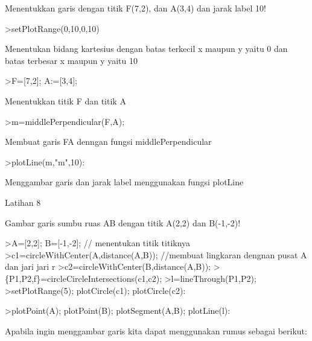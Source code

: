 \documentclass[a4paper,10pt]{article}
\begin{document}
\begin{eulernotebook}
\begin{eulercomment}
\begin{eulercomment}
\eulersubheading{}
\begin{eulercomment}
Menentukkan garis dengan titik F(7,2), dan A(3,4) dan jarak label 10!
\end{eulercomment}
\begin{eulerprompt}
>setPlotRange(0,10,0,10)
\end{eulerprompt}
\begin{euleroutput}
  [0,  10,  0,  10]
\end{euleroutput}
\begin{eulercomment}
Menentukan bidang kartesius dengan batas terkecil x maupun y yaitu 0
dan batas terbesar x maupun y yaitu 10
\end{eulercomment}
\begin{eulerprompt}
>F=[7,2]; A:=[3,4];
\end{eulerprompt}
\begin{eulercomment}
Menentukkan titik F dan titik A
\end{eulercomment}
\begin{eulerprompt}
>m=middlePerpendicular(F,A);
\end{eulerprompt}
\begin{eulercomment}
Membuat garis FA denngan fungsi middlePerpendicular
\end{eulercomment}
\begin{eulerprompt}
>plotLine(m,"m",10):
\end{eulerprompt}
\begin{eulercomment}
Menggambar garis dan jarak label menggunakan fungsi plotLine

Latihan 8\\
\end{eulercomment}
\eulersubheading{}
\begin{eulercomment}
Gambar garis sumbu ruas AB dengan titik A(2,2) dan B(-1,-2)!
\end{eulercomment}
\begin{eulerprompt}
>A=[2,2]; B=[-1,-2]; // menentukan titik titiknya
>c1=circleWithCenter(A,distance(A,B)); //membuat lingkaran dengnan pusat A dan jari jari r
>c2=circleWithCenter(B,distance(A,B));
>\{P1,P2,f\}=circleCircleIntersections(c1,c2);
>l=lineThrough(P1,P2);
>setPlotRange(5); plotCircle(c1); plotCircle(c2):
\end{eulerprompt}
\begin{eulerprompt}
>plotPoint(A); plotPoint(B); plotSegment(A,B); plotLine(l):
\end{eulerprompt}
\begin{eulercomment}
Apabila ingin menggambar garis kita dapat menggunakan rumus sebagai
berikut:


\end{eulercomment}
\end{eulercomment}
\end{eulercomment}
\end{eulernotebook}
\end{document}
